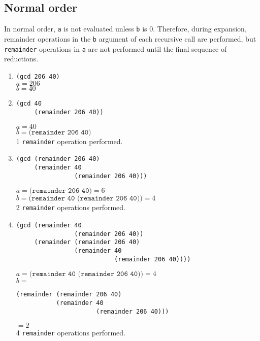 \documentclass{article}
\begin{document}
\subsection{Normal order}
In normal order, \texttt{a} is not evaluated unless \texttt{b} is 0. Therefore,
during expansion, remainder operations in the \texttt{b} argument of each
recursive call are performed, but \texttt{remainder} operations in \texttt{a}
are not performed until the final sequence of reductions.

\begin{enumerate}
    \item \lstinline|(gcd 206 40)|\\
        $a=206$\\
        $b=40$

    \item
        \begin{lstlisting}
(gcd 40
     (remainder 206 40))
        \end{lstlisting}
        $a=40$\\
        $b=\texttt{(remainder 206 40)}$\\
        1 \texttt{remainder} operation performed.

    \item
        \begin{lstlisting}
(gcd (remainder 206 40)
     (remainder 40
                (remainder 206 40)))
        \end{lstlisting}
        $a=\texttt{(remainder 206 40)}=6$\\
        $b=\texttt{(remainder 40 (remainder 206 40))}=4$\\
        2 \texttt{remainder} operations performed.

    \item
        \begin{lstlisting}
(gcd (remainder 40
                (remainder 206 40))
     (remainder (remainder 206 40)
                (remainder 40
                           (remainder 206 40))))
        \end{lstlisting}
        $a=\texttt{(remainder 40 (remainder 206 40))}=4$\\
        $b=$
        \begin{lstlisting}
(remainder (remainder 206 40)
           (remainder 40
                      (remainder 206 40)))
        \end{lstlisting}
        $=2$\\
        4 \texttt{remainder} operations performed.


\end{enumerate}
\end{document}
